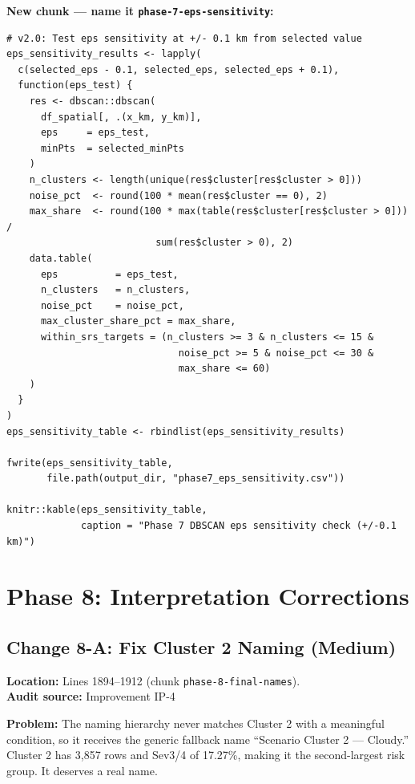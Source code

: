 \documentclass[11pt]{article}
\newcommand{\rcode}[1]{\texttt{#1}}
\begin{document}
\textbf{New chunk --- name it \rcode{phase-7-eps-sensitivity}:}
\begin{lstlisting}
# v2.0: Test eps sensitivity at +/- 0.1 km from selected value
eps_sensitivity_results <- lapply(
  c(selected_eps - 0.1, selected_eps, selected_eps + 0.1),
  function(eps_test) {
    res <- dbscan::dbscan(
      df_spatial[, .(x_km, y_km)],
      eps     = eps_test,
      minPts  = selected_minPts
    )
    n_clusters <- length(unique(res$cluster[res$cluster > 0]))
    noise_pct  <- round(100 * mean(res$cluster == 0), 2)
    max_share  <- round(100 * max(table(res$cluster[res$cluster > 0])) /
                          sum(res$cluster > 0), 2)
    data.table(
      eps          = eps_test,
      n_clusters   = n_clusters,
      noise_pct    = noise_pct,
      max_cluster_share_pct = max_share,
      within_srs_targets = (n_clusters >= 3 & n_clusters <= 15 &
                              noise_pct >= 5 & noise_pct <= 30 &
                              max_share <= 60)
    )
  }
)
eps_sensitivity_table <- rbindlist(eps_sensitivity_results)

fwrite(eps_sensitivity_table,
       file.path(output_dir, "phase7_eps_sensitivity.csv"))

knitr::kable(eps_sensitivity_table,
             caption = "Phase 7 DBSCAN eps sensitivity check (+/-0.1 km)")
\end{lstlisting}

\section{Phase 8: Interpretation Corrections}

\subsection{Change 8-A: Fix Cluster 2 Naming (Medium)}

\textbf{Location:} Lines 1894--1912 (chunk \rcode{phase-8-final-names}).\\
\textbf{Audit source:} Improvement IP-4

\textbf{Problem:} The naming hierarchy never matches Cluster 2 with a
meaningful condition, so it receives the generic fallback name
``Scenario Cluster 2 --- Cloudy.'' Cluster 2 has 3{,}857 rows and Sev3/4 of
17.27\%, making it the second-largest risk group. It deserves a real name.
\end{document}
